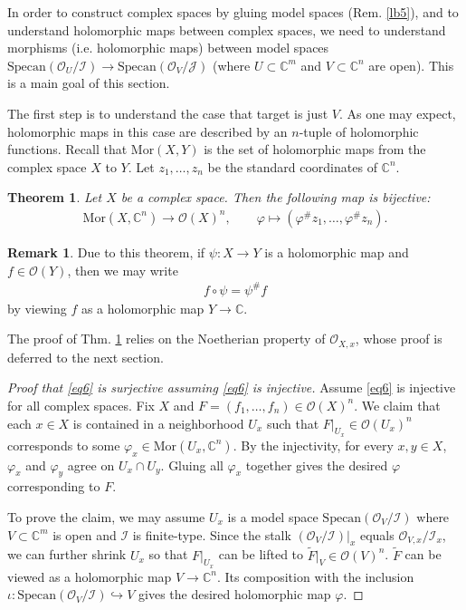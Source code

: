 \documentclass[12pt,b5paper,notitlepage]{report}
\theoremstyle{definition}
\newtheorem{rem}[df]{Remark}
\theoremstyle{plain}
\newtheorem{thm}[df]{Theorem}
\newcommand{\mc}{\mathcal}
\newcommand{\wtd}{\widetilde}
\newcommand{\scr}{\mathscr}
\newcommand{\Cbb}{\mathbb C}
\newcommand{\Specan}{\mathrm{Specan}}
\newcommand{\Mor}{\mathrm{Mor}}
\numberwithin{equation}{section}
\begin{document}
In order to construct complex spaces by gluing model spaces (Rem. \ref{lb5}), and to understand holomorphic maps between complex spaces, we need to understand morphisms (i.e. holomorphic maps) between model spaces $\Specan(\scr O_U/\mc I)\rightarrow\Specan(\scr O_V/\mc J)$ (where $U\subset\Cbb^m$ and $V\subset \Cbb^n$ are open). This is a main goal of this section. 

The first step is to understand the case that target is just $V$. As one may expect, holomorphic maps in this case are described by an $n$-tuple of holomorphic functions. Recall that $\Mor(X,Y)$ is the set of holomorphic maps from the complex space $X$ to  $Y$. Let $z_1,\dots,z_n$ be the standard coordinates of $\Cbb^n$.


\begin{thm}\label{lb7}
Let $X$ be a complex space. Then the following map is bijective:
\begin{gather}
\Mor(X,\Cbb^n)\rightarrow\scr O(X)^n,\qquad \varphi\mapsto (\varphi^\#z_1,\dots,\varphi^\#z_n).\label{eq6}
\end{gather}
\end{thm}











\begin{rem}\label{lb6}
Due to this theorem, if $\psi:X\rightarrow Y$ is a holomorphic map and $f\in\scr O(Y)$, then we may write
\begin{align}
f\circ\psi=\psi^\#f
\end{align}
by viewing $f$ as a holomorphic map $Y\rightarrow\Cbb$.
\end{rem}



The proof of Thm. \ref{lb7} relies on the Noetherian property of $\scr O_{X,x}$, whose proof is deferred to the next section.



\begin{proof}[Proof that \eqref{eq6} is surjective assuming \eqref{eq6} is injective]
Assume \eqref{eq6} is injective for all complex spaces. Fix $X$ and $F=(f_1,\dots,f_n)\in\scr O(X)^n$. We claim that each $x\in X$ is contained in a neighborhood $U_x$ such that $F|_{U_x}\in\scr O(U_x)^n$ corresponds to some $\varphi_x\in\Mor(U_x,\Cbb^n)$. By the injectivity, for every $x,y\in X$, $\varphi_x$ and $\varphi_y$ agree on $U_x\cap U_y$. Gluing all $\varphi_x$ together gives the desired $\varphi$ corresponding to $F$.

To prove the claim, we may assume $U_x$ is a model space $\Specan(\scr O_V/\mc I)$ where $V\subset\Cbb^m$ is open and $\mc I$ is finite-type. Since the stalk $(\scr O_V/\mc I)|_x$ equals $\scr O_{V,x}/\mc I_x$, we can further shrink $U_x$ so that $F|_{U_x}$ can be lifted to $\wtd F|_V\in\scr O(V)^n$. $\wtd F$ can be viewed as a holomorphic map $V\rightarrow\Cbb^n$. Its composition with the inclusion $\iota:\Specan(\scr O_V/\mc I)\hookrightarrow V$ gives the desired holomorphic map $\varphi$.
\end{proof}
\end{document}
